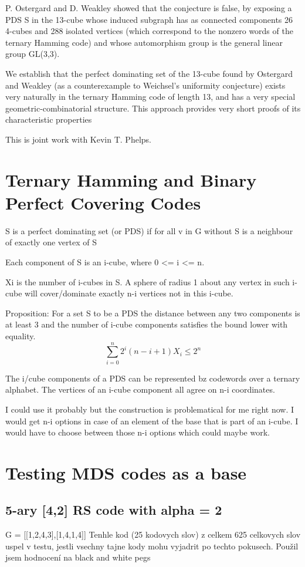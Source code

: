P. Ostergard and D. Weakley showed that the conjecture is false, by exposing a PDS S in the 13-cube whose induced subgraph has as connected components 26 4-cubes and 288 isolated vertices (which correspond to the nonzero words of the ternary Hamming code) and whose automorphism group is the general linear group GL(3,3).

We establish that the perfect dominating set of the 13-cube found by Ostergard and Weakley (as a counterexample to Weichsel's uniformity conjecture) exists very naturally in the ternary Hamming code of length 13, and has a very special geometric-combinatorial structure. This approach provides very short proofs of its characteristic properties

This is joint work with Kevin T. Phelps.

\section{Ternary Hamming and Binary Perfect Covering Codes}
S is a perfect dominating set (or PDS) if for all v in G without S is a neighbour of exactly one vertex of S

Each component of S is an i-cube, where 0 <= i <= n.

Xi is the number of i-cubes in S.
A sphere of radius 1 about any vertex in such i-cube will cover/dominate exactly n-i vertices not in this i-cube. 

Proposition: For a set S to be a PDS the distance between any two components is at least 3 and the number of i-cube components satisfies the bound lower with equality.
\[
\sum_{i = 0}^n 2^i(n-i+1)X_i \leq 2^n
\]

The i/cube components of a PDS can be represented bz codewords over a ternary alphabet. The vertices of an i-cube component all agree on n-i coordinates.

I could use it probably but the construction is problematical for me right now. I would get n-i options in case of an element of the base that is part of an i-cube. I would have to choose between those n-i options which could maybe work.

\section{Testing MDS codes as a base}
\subsection{5-ary [4,2] RS code with alpha = 2}
G = [[1,2,4,3],[1,4,1,4]]
Tenhle kod (25 kodovych slov) z celkem 625 celkovych slov uspel v testu, jestli vsechny tajne kody mohu vyjadrit po techto pokusech. 
Použil jsem hodnocení na black and white pegs

